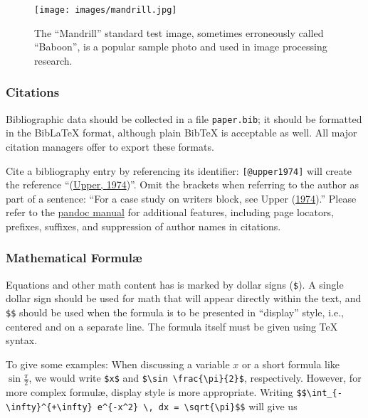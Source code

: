 \documentclass[
]{article}
\begin{document}
\begin{figure}
\hypertarget{fig:mandrill}{%
\centering
\texttt{[image: images/mandrill.jpg]}
\caption{The ``Mandrill'' standard test image, sometimes erroneously
called ``Baboon'', is a popular sample photo and used in image
processing research.}\label{fig:mandrill}
}
\end{figure}

\hypertarget{citations}{%
\subsubsection{Citations}\label{citations}}

Bibliographic data should be collected in a file \texttt{paper.bib}; it
should be formatted in the BibLaTeX format, although plain BibTeX is
acceptable as well. All major citation managers offer to export these
formats.

Cite a bibliography entry by referencing its identifier:
\texttt{{[}@upper1974{]}} will create the reference
``(\protect\hyperlink{ref-upper1974}{Upper, 1974})''. Omit the brackets
when referring to the author as part of a sentence: ``For a case study
on writers block, see Upper (\protect\hyperlink{ref-upper1974}{1974}).''
Please refer to the
\href{https://pandoc.org/MANUAL\#extension-citations}{pandoc manual} for
additional features, including page locators, prefixes, suffixes, and
suppression of author names in citations.

\hypertarget{mathematical-formuluxe6}{%
\subsubsection{Mathematical Formulæ}\label{mathematical-formuluxe6}}

Equations and other math content has is marked by dollar signs
(\texttt{\$}). A single dollar sign should be used for math that will
appear directly within the text, and \texttt{\$\$} should be used when
the formula is to be presented in ``display'' style, i.e., centered and
on a separate line. The formula itself must be given using TeX syntax.

To give some examples: When discussing a variable \(x\) or a short
formula like \(\sin \frac{\pi}{2}\), we would write \texttt{\$x\$} and
\texttt{\$\textbackslash{}sin\ \textbackslash{}frac\{\textbackslash{}pi\}\{2\}\$},
respectively. However, for more complex formulæ, display style is more
appropriate. Writing
\texttt{\$\$\textbackslash{}int\_\{-\textbackslash{}infty\}\^{}\{+\textbackslash{}infty\}\ e\^{}\{-x\^{}2\}\ \textbackslash{},\ dx\ =\ \textbackslash{}sqrt\{\textbackslash{}pi\}\$\$}
will give us
\end{document}
